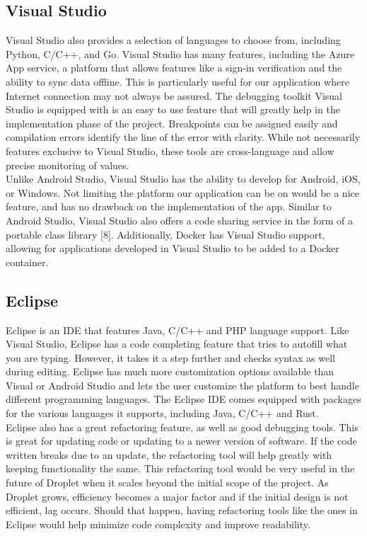 \documentclass[draftclsnofoot, onecolumn, letterpaper,10pt,compsoc]{IEEEtran}
\begin{document}
\subsection{Visual Studio}
Visual Studio also provides a selection of languages to choose from, including Python, C/C++, and Go.  Visual Studio has many features, including the Azure App service, a platform that allows features like a sign-in verification and the ability to sync data offline.  This is particularly useful for our application where Internet connection may not always be assured.  The debugging toolkit Visual Studio is equipped with is an easy to use feature that will greatly help in the implementation phase of the project.  Breakpoints can be assigned easily and compilation errors identify the line of the error with clarity.  While not necessarily features exclusive to Visual Studio, these tools are cross-language and allow precise monitoring of values.\\
Unlike Android Studio, Visual Studio has the ability to develop for Android, iOS, or Windows.  Not limiting the platform our application can be on would be a nice feature, and has no drawback on the implementation of the app.  Similar to Android Studio, Visual Studio also offers a code sharing service in the form of a portable class library [8].  Additionally, Docker has Visual Studio support, allowing for applications developed in Visual Studio to be added to a Docker container.
\subsection{Eclipse}
Eclipse is an IDE that features Java, C/C++ and PHP language support.  Like Visual Studio, Eclipse has a code completing feature that tries to autofill what you are typing.  However, it takes it a step further and checks syntax as well during editing. Eclipse has much more customization options available than Visual or Android Studio and lets the user customize the platform to best handle different programming languages.  The Eclipse IDE comes equipped with packages for the various languages it supports, including Java, C/C++ and Rust.\\
Eclipse also has a great refactoring feature, as well as good debugging tools.  This is great for updating code or updating to a newer version of software.  If the code written breaks due to an update, the refactoring tool will help greatly with keeping functionality the same.  This refactoring tool would be very useful in the future of Droplet when it scales beyond the initial scope of the project.  As Droplet grows, efficiency becomes a major factor and if the initial design is not efficient, lag occurs.  Should that happen, having refactoring tools like the ones in Eclipse would help minimize code complexity and improve readability.
\end{document}
